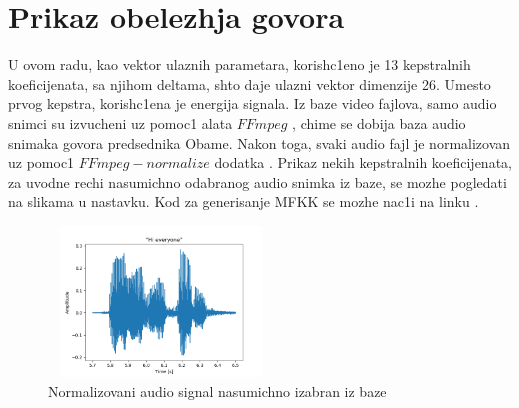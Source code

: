\documentclass[a4paper, openany, oneside, 11pt]{book}
\begin{document}
\section{Prikaz obelezhja govora}
U ovom radu, kao vektor ulaznih parametara, korish\-c1eno je 13 kepstralnih koeficijenata, sa njihom deltama, shto daje ulazni vektor dimenzije 26. Umesto prvog kepstra, korish\-c1ena je energija signala. Iz baze video fajlova, samo audio snimci su izvucheni uz pomoc1 alata $FFmpeg$ \cite{FFmpeg}, chime se dobija baza audio snimaka govora predsednika Obame. Nakon toga, svaki audio fajl je normalizovan uz pomoc1 $FFmpeg-normalize$ dodatka \cite{FFmpegN}. Prikaz nekih kepstralnih koeficijenata, za uvodne rechi nasumichno odabranog audio snimka iz baze, se mozhe pogledati na slikama u nastavku. Kod za generisanje \acrshort{MFKK} se mozhe nac1i na linku \cite{gh2}.
\begin{figure}[h!]
\centering
  \includegraphics[width=6cm, height = 4cm]{res/audio_sig.png}
  \caption{Normalizovani audio signal nasumichno izabran iz baze}
  \label{fig:3}
  \vspace{0pt}
\end{figure}
\end{document}
